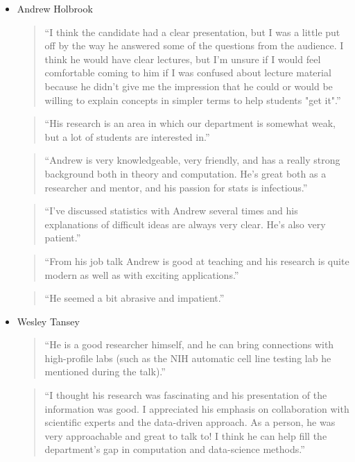 \documentclass[]{article}
\begin{document}
\begin{itemize}
\item
  Andrew Holbrook

  \begin{quote}
  ``I think the candidate had a clear presentation, but I was a little
  put off by the way he answered some of the questions from the
  audience. I think he would have clear lectures, but I'm unsure if I
  would feel comfortable coming to him if I was confused about lecture
  material because he didn't give me the impression that he could or
  would be willing to explain concepts in simpler terms to help students
  "get it".''
  \end{quote}

  \begin{quote}
  ``His research is an area in which our department is somewhat weak,
  but a lot of students are interested in.''
  \end{quote}

  \begin{quote}
  ``Andrew is very knowledgeable, very friendly, and has a really strong
  background both in theory and computation. He's great both as a
  researcher and mentor, and his passion for stats is infectious.''
  \end{quote}

  \begin{quote}
  ``I've discussed statistics with Andrew several times and his
  explanations of difficult ideas are always very clear. He's also very
  patient.''
  \end{quote}

  \begin{quote}
  ``From his job talk Andrew is good at teaching and his research is
  quite modern as well as with exciting applications.''
  \end{quote}

  \begin{quote}
  ``He seemed a bit abrasive and impatient.''
  \end{quote}
\item
  Wesley Tansey

  \begin{quote}
  ``He is a good researcher himself, and he can bring connections with
  high-profile labs (such as the NIH automatic cell line testing lab he
  mentioned during the talk).''
  \end{quote}

  \begin{quote}
  ``I thought his research was fascinating and his presentation of the
  information was good. I appreciated his emphasis on collaboration with
  scientific experts and the data-driven approach. As a person, he was
  very approachable and great to talk to! I think he can help fill the
  department's gap in computation and data-science methods.''
  \end{quote}


\end{itemize}
\end{document}
